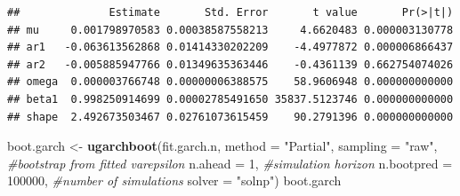 \documentclass[
]{book}
\newenvironment{Shaded}{\begin{snugshade}}{\end{snugshade}}
\newcommand{\AttributeTok}[1]{\textcolor[rgb]{0.13,0.29,0.53}{#1}}
\newcommand{\CommentTok}[1]{\textcolor[rgb]{0.56,0.35,0.01}{\textit{#1}}}
\newcommand{\DecValTok}[1]{\textcolor[rgb]{0.00,0.00,0.81}{#1}}
\newcommand{\FunctionTok}[1]{\textcolor[rgb]{0.13,0.29,0.53}{\textbf{#1}}}
\newcommand{\NormalTok}[1]{#1}
\newcommand{\OtherTok}[1]{\textcolor[rgb]{0.56,0.35,0.01}{#1}}
\newcommand{\SpecialCharTok}[1]{\textcolor[rgb]{0.81,0.36,0.00}{\textbf{#1}}}
\newcommand{\StringTok}[1]{\textcolor[rgb]{0.31,0.60,0.02}{#1}}
\begin{document}
\begin{Shaded}
\end{Shaded}

\begin{verbatim}
##              Estimate       Std. Error       t value       Pr(>|t|)
## mu     0.001798970583 0.00038587558213     4.6620483 0.000003130778
## ar1   -0.063613562868 0.01414330202209    -4.4977872 0.000006866437
## ar2   -0.005885947766 0.01349635363446    -0.4361139 0.662754074026
## omega  0.000003766748 0.00000006388575    58.9606948 0.000000000000
## beta1  0.998250914699 0.00002785491650 35837.5123746 0.000000000000
## shape  2.492673503467 0.02761073615459    90.2791396 0.000000000000
\end{verbatim}

\begin{Shaded}
\begin{Highlighting}[]
\NormalTok{boot.garch }\OtherTok{\textless{}{-}} \FunctionTok{ugarchboot}\NormalTok{(fit.garch.n,}
                         \AttributeTok{method =} \StringTok{"Partial"}\NormalTok{,}
                         \AttributeTok{sampling =} \StringTok{"raw"}\NormalTok{,  }\CommentTok{\#bootstrap from fitted varepsilon}
                         \AttributeTok{n.ahead =} \DecValTok{1}\NormalTok{,          }\CommentTok{\#simulation horizon}
                         \AttributeTok{n.bootpred =} \DecValTok{100000}\NormalTok{, }\CommentTok{\#number of simulations }
                         \AttributeTok{solver =} \StringTok{"solnp"}\NormalTok{)}
\NormalTok{boot.garch}
\end{Highlighting}
\end{Shaded}
\end{document}
